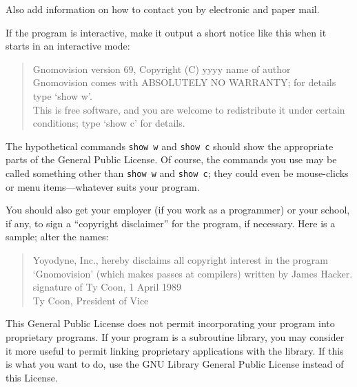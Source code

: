 \documentclass{article}
\begin{document}
Also add information on how to contact you by electronic and paper mail.

If the program is interactive, make it output a short notice like this
when it starts in an interactive mode:

\begin{quote}
Gnomovision version 69, Copyright (C) yyyy  name of author \\
Gnomovision comes with ABSOLUTELY NO WARRANTY; for details type `show w'. \\
This is free software, and you are welcome to redistribute it
under certain conditions; type `show c' for details.
\end{quote}


The hypothetical commands {\tt show w} and {\tt show c} should show the
appropriate parts of the General Public License.  Of course, the commands
you use may be called something other than {\tt show w} and {\tt show c};
they could even be mouse-clicks or menu items---whatever suits your
program.

You should also get your employer (if you work as a programmer) or your
school, if any, to sign a ``copyright disclaimer'' for the program, if
necessary.  Here is a sample; alter the names:

\begin{quote}
Yoyodyne, Inc., hereby disclaims all copyright interest in the program \\
`Gnomovision' (which makes passes at compilers) written by James Hacker. \\

signature of Ty Coon, 1 April 1989 \\
Ty Coon, President of Vice
\end{quote}

This General Public License does not permit incorporating your program
into proprietary programs.  If your program is a subroutine library, you
may consider it more useful to permit linking proprietary applications
with the library.  If this is what you want to do, use the GNU Library
General Public License instead of this License.


\end{document}
